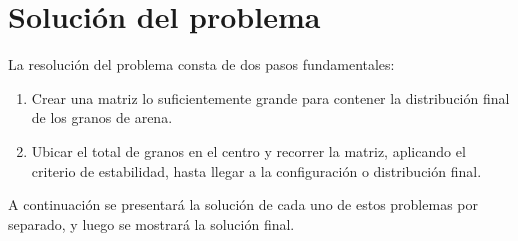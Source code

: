 \documentclass[letterpaper,11pt]{article} %
\begin{document}
\newpage

\section{Solución del problema}
La resolución del problema consta de dos pasos fundamentales:
\begin{enumerate}
\item Crear una matriz lo suficientemente grande para contener la distribución final de los granos de arena.
\item Ubicar el total de granos en el centro y recorrer la matriz, aplicando el criterio de estabilidad, hasta llegar a la configuración o distribución final.
\end{enumerate}
A continuación se presentará la solución de cada uno de estos problemas por separado, y luego se mostrará la solución final.
\end{document}
